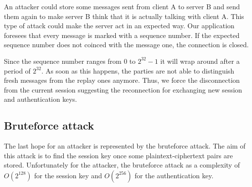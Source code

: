 \documentclass[a4paper,12pt]{article}
\begin{document}
An attacker could store some messages sent from client A to server B and send them again to make server B think that it is actually talking with client A. This type of attack could make the server act in an expected way. Our application foresees that every message is marked with a sequence number. If the expected sequence number does not coinced with the message one, the connection is closed.

Since the sequence number ranges from $0$ to $2^{32} - 1$ it will wrap around after a period of $2^{32}$. As soon as this happens, the parties are not able to distinguish fresh messages from the replay ones anymore. Thus, we force the disconnection from the current session suggesting the reconnection for exchanging new session and authentication keys. 

\subsection{Bruteforce attack}
The last hope for an attacker is represented by the bruteforce attack. The aim of this attack is to find the session key once some plaintext-ciphertext pairs are stored.
Unfortunately for the attacker, the bruteforce attack as a complexity of $O(2^{128})$ for the session key and $O(2^{256})$ for the authentication key.
\end{document}
